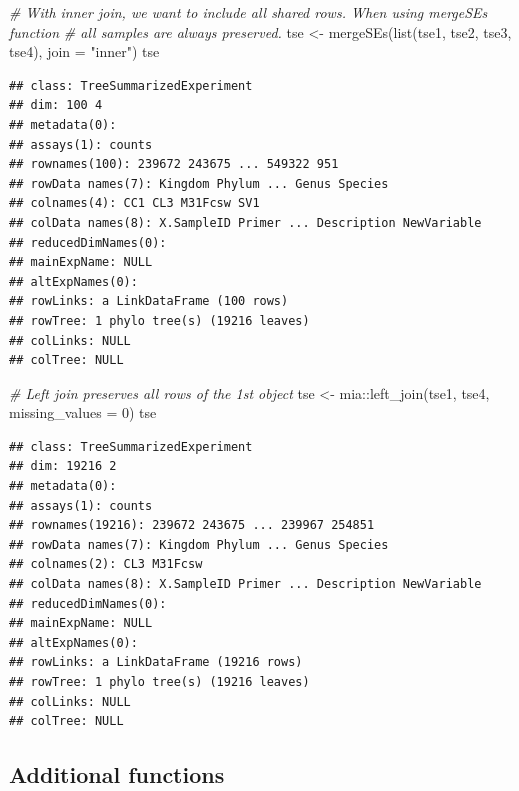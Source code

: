 \documentclass[
]{book}
\newenvironment{Shaded}{\begin{snugshade}}{\end{snugshade}}
\newcommand{\AttributeTok}[1]{\textcolor[rgb]{0.77,0.63,0.00}{#1}}
\newcommand{\CommentTok}[1]{\textcolor[rgb]{0.56,0.35,0.01}{\textit{#1}}}
\newcommand{\DecValTok}[1]{\textcolor[rgb]{0.00,0.00,0.81}{#1}}
\newcommand{\FunctionTok}[1]{\textcolor[rgb]{0.00,0.00,0.00}{#1}}
\newcommand{\NormalTok}[1]{#1}
\newcommand{\OtherTok}[1]{\textcolor[rgb]{0.56,0.35,0.01}{#1}}
\newcommand{\SpecialCharTok}[1]{\textcolor[rgb]{0.00,0.00,0.00}{#1}}
\newcommand{\StringTok}[1]{\textcolor[rgb]{0.31,0.60,0.02}{#1}}
\begin{document}
\begin{Shaded}
\begin{Highlighting}[]
\CommentTok{\# With inner join, we want to include all shared rows. When using mergeSEs function}
\CommentTok{\# all samples are always preserved.}
\NormalTok{tse }\OtherTok{\textless{}{-}} \FunctionTok{mergeSEs}\NormalTok{(}\FunctionTok{list}\NormalTok{(tse1, tse2, tse3, tse4), }\AttributeTok{join =} \StringTok{"inner"}\NormalTok{)}
\NormalTok{tse}
\end{Highlighting}
\end{Shaded}

\begin{verbatim}
## class: TreeSummarizedExperiment 
## dim: 100 4 
## metadata(0):
## assays(1): counts
## rownames(100): 239672 243675 ... 549322 951
## rowData names(7): Kingdom Phylum ... Genus Species
## colnames(4): CC1 CL3 M31Fcsw SV1
## colData names(8): X.SampleID Primer ... Description NewVariable
## reducedDimNames(0):
## mainExpName: NULL
## altExpNames(0):
## rowLinks: a LinkDataFrame (100 rows)
## rowTree: 1 phylo tree(s) (19216 leaves)
## colLinks: NULL
## colTree: NULL
\end{verbatim}

\begin{Shaded}
\begin{Highlighting}[]
\CommentTok{\# Left join preserves all rows of the 1st object}
\NormalTok{tse }\OtherTok{\textless{}{-}}\NormalTok{ mia}\SpecialCharTok{::}\FunctionTok{left\_join}\NormalTok{(tse1, tse4, }\AttributeTok{missing\_values =} \DecValTok{0}\NormalTok{)}
\NormalTok{tse}
\end{Highlighting}
\end{Shaded}

\begin{verbatim}
## class: TreeSummarizedExperiment 
## dim: 19216 2 
## metadata(0):
## assays(1): counts
## rownames(19216): 239672 243675 ... 239967 254851
## rowData names(7): Kingdom Phylum ... Genus Species
## colnames(2): CL3 M31Fcsw
## colData names(8): X.SampleID Primer ... Description NewVariable
## reducedDimNames(0):
## mainExpName: NULL
## altExpNames(0):
## rowLinks: a LinkDataFrame (19216 rows)
## rowTree: 1 phylo tree(s) (19216 leaves)
## colLinks: NULL
## colTree: NULL
\end{verbatim}

\hypertarget{additional-functions}{%
\subsection{Additional functions}\label{additional-functions}}
\end{document}
